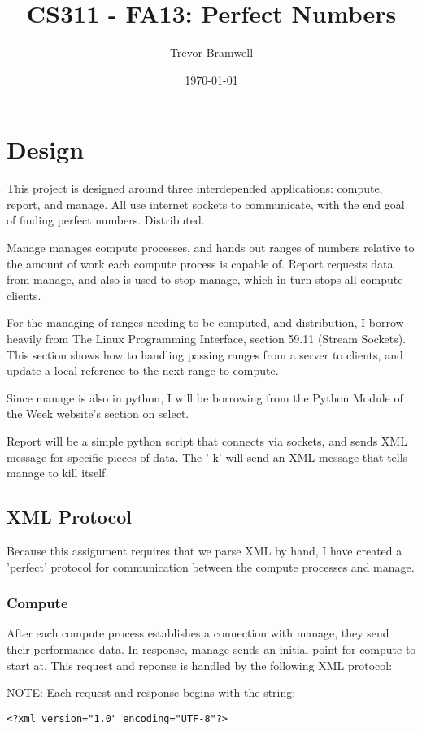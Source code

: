 \documentclass[letterpaper,10pt]{article}
\title{CS311 - FA13: Perfect Numbers}
\date{\today}
\author{Trevor Bramwell}
\begin{document}
\maketitle

\section{Design}

This project is designed around three interdepended applications:
compute, report, and manage. All use internet sockets to communicate,
with the end goal of finding perfect numbers. Distributed.

Manage manages compute processes, and hands out ranges of numbers
relative to the amount of work each compute process is capable of.
Report requests data from manage, and also is used to stop manage,
which in turn stops all compute clients.

For the managing of ranges needing to be computed, and distribution, I
borrow heavily from The Linux Programming Interface, section 59.11
(Stream Sockets). This section shows how to handling passing ranges from
a server to clients, and update a local reference to the next range to
compute.

Since manage is also in python, I will be borrowing from the Python
Module of the Week website's section on select.

Report will be a simple python script that connects via sockets, and
sends XML message for specific pieces of data. The '-k' will send an XML
message that tells manage to kill itself.

\subsection{XML Protocol}
Because this assignment requires that we parse XML by hand, I have
created a 'perfect' protocol for communication between the compute
processes and manage.

\subsubsection*{Compute}
After each compute process establishes a connection with manage, they
send their performance data. In response, manage sends an initial point
for compute to start at. This request and reponse is handled by the
following XML protocol:

NOTE: Each request and response begins with the string:
\begin{verbatim}
<?xml version="1.0" encoding="UTF-8"?>
\end{verbatim}
\end{document}
